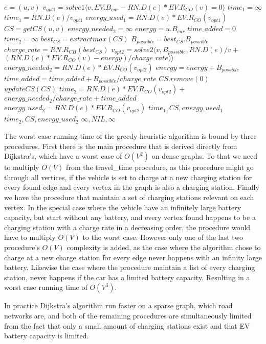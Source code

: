 \begin{algorithmic}
	\State $e = (u, v)$
	\State $v_{opt1} = solve1\langle v, EV.B_{cur}-RN.D(e)*EV.R_{CO}(v) = 0\rangle$
		\State $time_1 = \infty$
	\Else
		\State $time_1 = RN.D(e) / v_{opt1}$
		\State $energy\_used_{1} = RN.D(e)*EV.R_{CO}(v_{opt1})$
	\EndIf
		\State $CS = getCS(u, v)$ 
		\State $energy\_needed_{2} = \infty$
		\State $energy = u.B_{cur}$
		\State $time\_added = 0$
		\State $time_2 = \infty$
		\State $best_{CS} = extractmax(CS)$
		\State $B_{possible} = best_{CS}.B_{possible}$
		\State $charge\_rate = RN.R_{CH}(best_{CS})$
		\State $v_{opt2} = solve2 \langle v, B_{possible},  RN.D(e)/v + $
			\State $(RN.D(e)*EV.R_{CO}(v)-energy)/charge\_rate) \rangle$
		\State $energy\_needed_{2} = RN.D(e)*EV.R_{CO}(v_{opt2})$
		\State $energy = energy + B_{possible}$
			\State $time\_added = time\_added + B_{possible}/charge\_rate$
			\State $CS.remove(0)$
			\State $updateCS(CS)$
		\EndIf	
	\EndWhile
		\State $time_2 = RN.D(e)*EV.R_{CO}(v_{opt2}) + $
		\State $energy\_needed_{2}/charge\_rate + time\_added$
		\State $energy\_used_2 = RN.D(e)*EV.R_{CO}(v_{opt2})$
	\EndIf
		\State \Return $time_1, CS, energy\_used_1$
		\State \Return $time_2, CS, energy\_used_2$
	\Else
		\State \Return $\infty, NIL, \infty$
	\EndIf

\EndFunction
\end{algorithmic}\label{alg:fastest_path}

The worst case running time of the greedy heuristic algorithm is bound by three procedures. First there is the main procedure that is derived directly from Dijkstra's, which have a worst case of $O(V^2)$ on dense graphs. To that we need to multiply $O(V)$ from the travel\_time procedure, as this procedure might go through all vertices, if the vehicle is set to charge at a new charging station for every found edge and every vertex in the graph is also a charging station. Finally we have the procedure that maintain a set of charging stations relevant on each vertex. In the special case where the vehicle have an infinitely large battery capacity, but start without any battery, and every vertex found happens to be a charging station with a charge rate in a decreasing order, the procedure would have to multiply $O(V)$ to the worst case.
However only one of the last two procedure's $O(V)$ complexity is added, as the case where the algorithm chose to charge at a new charge station for every edge never happens with an infinity large battery. Likewise the case where the procedure maintain a list of every charging station, never happens if the car has a limited battery capacity. Resulting in a worst case running time of $O(V^3)$.

In practice Dijkstra's algorithm run faster on a sparse graph, which road networks are, and both of the remaining procedures are simultaneously limited from the fact that only a small amount of charging stations exist and that EV battery capacity is limited.




